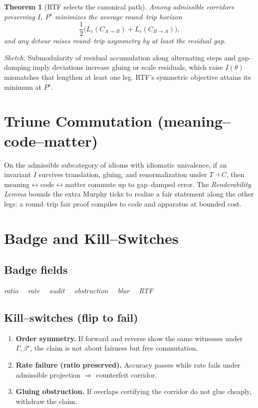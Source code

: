 \documentclass[11pt]{article}
\newtheorem{theorem}{Theorem}
\begin{document}
\begin{theorem}[RTF selects the canonical path]\label{thm:canonical}
Among admissible corridors preserving $I$, $P^\star$ minimizes the average round--trip horizon
\[
\frac{1}{2}\big(L_c(C_{A\to B})+L_c(C_{B\to A})\big),
\]
and any detour raises round--trip asymmetry by at least the residual gap.
\end{theorem}

\noindent\emph{Sketch.} Submodularity of residual accumulation along alternating steps and gap--damping imply deviations increase gluing or scale residuals, which raise $I(\theta)$ mismatches that lengthen at least one leg. RTF's symmetric objective attains its minimum at $P^\star$.

\section{Triune Commutation (meaning--code--matter)}
On the admissible subcategory of idioms with idiomatic univalence, if an invariant $I$ survives translation, gluing, and renormalization under $T\dashv C$, then meaning$\leftrightarrow$code$\leftrightarrow$matter commute up to gap--damped error. The \emph{Renderability Lemma} bounds the extra Murphy ticks to realize a fair statement along the other legs: a round--trip fair proof compiles to code and apparatus at bounded cost.

\section{Badge and Kill--Switches}
\subsection*{Badge fields}
\emph{ratio \ \ rate \ \ audit \ \ obstruction \ \ blur \ \ RTF}

\subsection*{Kill--switches (flip to fail)}
\begin{enumerate}[leftmargin=1.4em]
\item \textbf{Order symmetry.} If forward and reverse show the same witnesses under $\Gamma,\beta^\star$, the claim is not about fairness but free commutation.
\item \textbf{Rate failure (ratio preserved).} Accuracy passes while rate fails under admissible projection $\Rightarrow$ counterfeit corridor.
\item \textbf{Gluing obstruction.} If overlaps certifying the corridor do not glue cheaply, withdraw the claim.
\end{enumerate}
\end{document}

